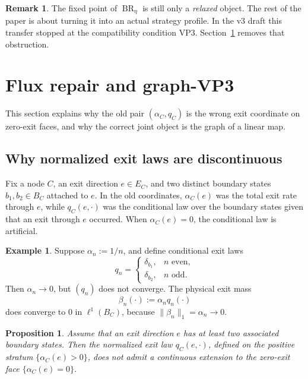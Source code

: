\documentclass[12pt]{article}
\newtheorem{proposition}[theorem]{Proposition}
\theoremstyle{definition}
\newtheorem{remark}[theorem]{Remark}
\newtheorem{example}[theorem]{Example}
\newcommand{\1}{\mathbf{1}}
\begin{document}
\begin{remark}
The fixed point of \(\operatorname{BR}_\eta\) is still only a \emph{relaxed} object.  The
rest of the paper is about turning it into an actual strategy profile.  In the v3 draft
this transfer stopped at the compatibility condition VP3.  Section~\ref{sec:flux} removes
that obstruction.
\end{remark}

\section{Flux repair and graph-VP3}
\label{sec:flux}

This section explains why the old pair \((\alpha_C,q_C)\) is the wrong exit coordinate on
zero-exit faces, and why the correct joint object is the graph of a linear map.

\subsection{Why normalized exit laws are discontinuous}

Fix a node \(C\), an exit direction \(e\in E_C\), and two distinct boundary states
\(b_1,b_2\in B_C\) attached to \(e\).  In the old coordinates, \(\alpha_C(e)\) was the
total exit rate through \(e\), while \(q_C(e,\cdot)\) was the conditional law over the
boundary states given that an exit through \(e\) occurred.  When \(\alpha_C(e)=0\), the
conditional law is artificial.

\begin{example}
\label{ex:alternating}
Suppose \(\alpha_n:=1/n\), and define conditional exit laws
\[
q_n=
\begin{cases}
\delta_{b_1}, & n \text{ even},\\
\delta_{b_2}, & n \text{ odd}.
\end{cases}
\]
Then \(\alpha_n\to 0\), but \((q_n)\) does not converge.  The physical exit mass
\[
\beta_n(\cdot):=\alpha_n q_n(\cdot)
\]
does converge to \(0\) in \(\ell^1(B_C)\), because \(\|\beta_n\|_1=\alpha_n\to 0\).
\end{example}

\begin{proposition}
\label{prop:no-continuous-q}
Assume that an exit direction \(e\) has at least two associated boundary states.  Then the
normalized exit law \(q_C(e,\cdot)\), defined on the positive stratum
\(\{\alpha_C(e)>0\}\), does not admit a continuous extension to the zero-exit face
\(\{\alpha_C(e)=0\}\).
\end{proposition}
\end{document}
